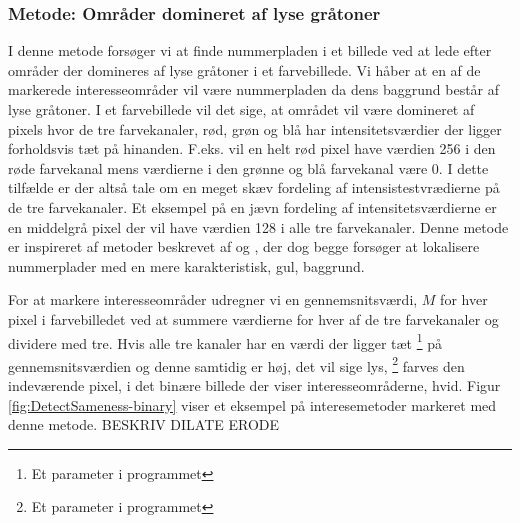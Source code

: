 \subsubsection{Metode: Områder domineret af lyse gråtoner}
\label{sec:DetectSameness}
I denne metode forsøger vi at finde nummerpladen i et billede ved at lede efter områder der domineres af lyse gråtoner i et farvebillede. Vi håber at en af de markerede interesseområder vil være nummerpladen da dens baggrund består af lyse gråtoner. I et farvebillede vil det sige, at området vil være domineret af pixels hvor de tre farvekanaler, rød, grøn og blå har intensitetsværdier der ligger forholdsvis tæt på hinanden. F.eks. vil en helt rød pixel have værdien 256 i den røde farvekanal mens værdierne i den grønne og blå farvekanal være 0. I dette tilfælde er der altså tale om en meget skæv fordeling af intensistestvrædierne på de tre farvekanaler. Et eksempel på en jævn fordeling af intensitetsværdierne er en middelgrå pixel der vil have værdien 128 i alle tre farvekanaler. Denne metode er inspireret af metoder beskrevet af \cite{ron} og \cite{nijhuis}, der dog begge forsøger at lokalisere nummerplader med en mere karakteristisk, gul, baggrund.

For at markere interesseområder udregner vi en gennemsnitsværdi, $M$ for hver pixel i farvebilledet ved at summere værdierne for hver af de tre farvekanaler og dividere med tre. Hvis alle tre kanaler har en værdi der ligger tæt \footnote{Et parameter i programmet} på gennemsnitsværdien og denne samtidig er høj, det vil sige lys, \footnote{Et parameter i programmet} farves den indeværende pixel, i det binære billede der viser interesseområderne, hvid. Figur \ref{fig:DetectSameness-binary} viser et eksempel på interesemetoder markeret med denne metode. 
BESKRIV DILATE ERODE

